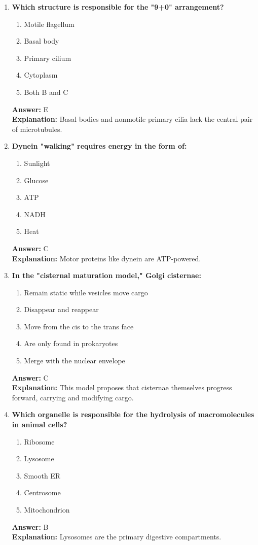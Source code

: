 \documentclass[11pt, a4paper]{article}
\begin{document}
\begin{enumerate}[leftmargin=*, label=\arabic*.]
\item \textbf{Which structure is responsible for the "9+0" arrangement?}
\begin{enumerate}[label=\Alph*.]
\item Motile flagellum
\item Basal body
\item Primary cilium
\item Cytoplasm
\item Both B and C
\end{enumerate}
\textbf{Answer:} E \\
\textbf{Explanation:} Basal bodies and nonmotile primary cilia lack the central pair of microtubules.

\item \textbf{Dynein "walking" requires energy in the form of:}
\begin{enumerate}[label=\Alph*.]
\item Sunlight
\item Glucose
\item ATP
\item NADH
\item Heat
\end{enumerate}
\textbf{Answer:} C \\
\textbf{Explanation:} Motor proteins like dynein are ATP-powered.

\item \textbf{In the "cisternal maturation model," Golgi cisternae:}
\begin{enumerate}[label=\Alph*.]
\item Remain static while vesicles move cargo
\item Disappear and reappear
\item Move from the cis to the trans face
\item Are only found in prokaryotes
\item Merge with the nuclear envelope
\end{enumerate}
\textbf{Answer:} C \\
\textbf{Explanation:} This model proposes that cisternae themselves progress forward, carrying and modifying cargo.

\item \textbf{Which organelle is responsible for the hydrolysis of macromolecules in animal cells?}
\begin{enumerate}[label=\Alph*.]
\item Ribosome
\item Lysosome
\item Smooth ER
\item Centrosome
\item Mitochondrion
\end{enumerate}
\textbf{Answer:} B \\
\textbf{Explanation:} Lysosomes are the primary digestive compartments.


\end{enumerate}
\end{document}
